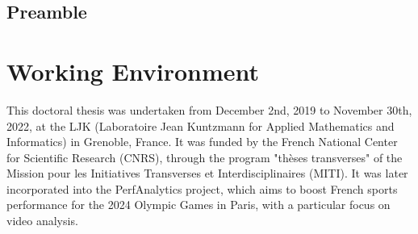 {}

\vspace*{-1cm}
\begin{flushright}
\section*{\fontsize{20pt}{20pt}\selectfont\textnormal{Preamble}}
\end{flushright}
\vspace{2cm}

\chead[\fancyplain{}{}]
      {\fancyplain{}{}}
\lfoot[\fancyplain{}{}]%
      {\fancyplain{}{}}
\cfoot[\fancyplain{}{\thepage}]
      {\fancyplain{}{\thepage}}
\rfoot[\fancyplain{}{}]%
     {\fancyplain{}{\scriptsize}}
     


\section*{Working Environment}

This doctoral thesis was undertaken from December 2nd, 2019 to November 30th, 2022, at the LJK (Laboratoire Jean Kuntzmann for Applied Mathematics and Informatics) in Grenoble, France. It was funded by the French National Center for Scientific Research (CNRS), 
through the program "thèses transverses" of the Mission pour les Initiatives
Transverses et Interdisciplinaires (MITI).
It was later incorporated into the PerfAnalytics project, which aims to boost French sports performance for the 2024 Olympic Games in Paris, with a particular focus on video analysis.


